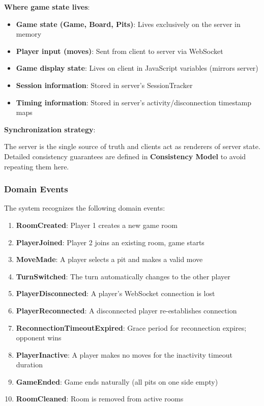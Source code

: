 \documentclass{scrartcl}
\begin{document}
\textbf{Where game state lives}:

\begin{itemize}
  \item \textbf{Game state (Game, Board, Pits)}: Lives exclusively on the server in memory
  \item \textbf{Player input (moves)}: Sent from client to server via WebSocket
  \item \textbf{Game display state}: Lives on client in JavaScript variables (mirrors server)
  \item \textbf{Session information}: Stored in server's SessionTracker
  \item \textbf{Timing information}: Stored in server's activity/disconnection timestamp maps
\end{itemize}

\textbf{Synchronization strategy}:

The server is the single source of truth and clients act as renderers of server state.
Detailed consistency guarantees are defined in \textbf{Consistency Model} to avoid repeating them here.

\subsubsection{Domain Events}

The system recognizes the following domain events:

\begin{enumerate}
  \item \textbf{RoomCreated}: Player 1 creates a new game room
  \item \textbf{PlayerJoined}: Player 2 joins an existing room, game starts
  \item \textbf{MoveMade}: A player selects a pit and makes a valid move
  \item \textbf{TurnSwitched}: The turn automatically changes to the other player
  \item \textbf{PlayerDisconnected}: A player's WebSocket connection is lost
  \item \textbf{PlayerReconnected}: A disconnected player re-establishes connection
  \item \textbf{ReconnectionTimeoutExpired}: Grace period for reconnection expires; opponent wins
  \item \textbf{PlayerInactive}: A player makes no moves for the inactivity timeout duration
  \item \textbf{GameEnded}: Game ends naturally (all pits on one side empty)
  \item \textbf{RoomCleaned}: Room is removed from active rooms
\end{enumerate}
\end{document}
